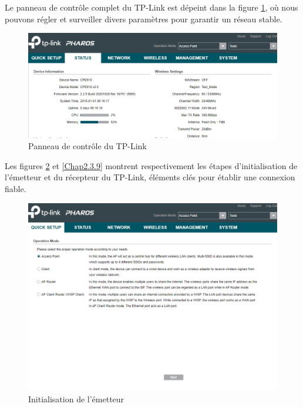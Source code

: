 Le panneau de contrôle complet du TP-Link est dépeint dans la figure \ref{Chap2.3.7}, où nous pouvons régler et surveiller divers paramètres pour garantir un réseau stable.

\begin{figure}[H]
\centering
\includegraphics[width=15cm]{Images/tplink34-2.png}
\caption{Panneau de contrôle du TP-Link}
\label{Chap2.3.7}
\end{figure}

Les figures \ref{Chap2.3.8} et \ref{Chap2.3.9} montrent respectivement les étapes d'initialisation de l'émetteur et du récepteur du TP-Link, éléments clés pour établir une connexion fiable.

\begin{figure}[H]
\centering
\includegraphics[width=15cm]{Images/tplink35-2.png}
\caption{Initialisation de l'émetteur}
\label{Chap2.3.8}
\end{figure}

